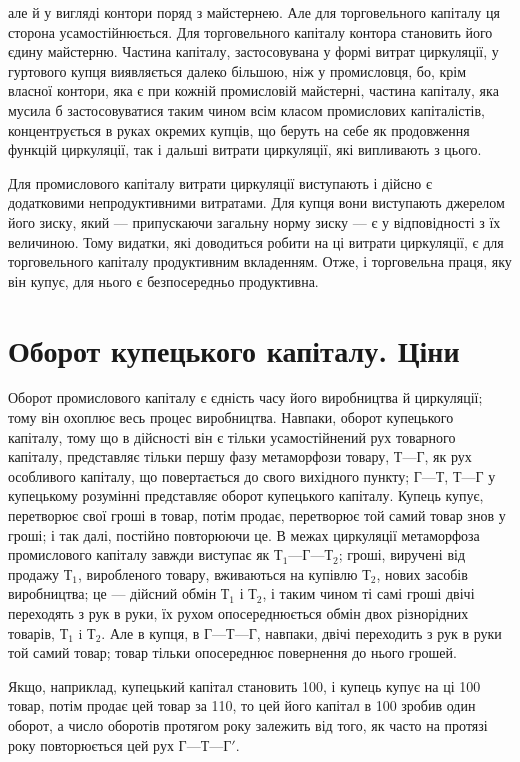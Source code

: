 \parcont{}  %
але й у вигляді контори поряд з майстернею. Але для торговельного
капіталу ця сторона усамостійнюється. Для торговельного
капіталу контора становить його єдину майстерню. Частина
капіталу, застосовувана у формі витрат циркуляції, у гуртового
купця виявляється далеко більшою, ніж у промисловця, бо, крім
власної контори, яка є при кожній промисловій майстерні, частина
капіталу, яка мусила б застосовуватися таким чином всім
класом промислових капіталістів, концентрується в руках окремих
купців, що беруть на себе як продовження функцій циркуляції,
так і дальші витрати циркуляції, які випливають з цього.

Для промислового капіталу витрати циркуляції виступають
і дійсно є додатковими непродуктивними витратами. Для купця
вони виступають джерелом його зиску, який — припускаючи загальну
норму зиску — є у відповідності з їх величиною. Тому
видатки, які доводиться робити на ці витрати циркуляції, є для
торговельного капіталу продуктивним вкладенням. Отже, і торговельна
праця, яку він купує, для нього є безпосередньо
продуктивна.

\section{Оборот купецького капіталу. Ціни}

Оборот промислового капіталу є єдність часу його виробництва
й циркуляції; тому він охоплює весь процес виробництва.
Навпаки, оборот купецького капіталу, тому що в дійсності
він є тільки усамостійнений рух товарного капіталу, представляє
тільки першу фазу метаморфози товару, $Т — Г$, як рух
особливого капіталу, що повертається до свого вихідного пункту;
$Г — Т$, $Т — Г$ у купецькому розумінні представляє оборот купецького
капіталу. Купець купує, перетворює свої гроші в товар, потім
продає, перетворює той самий товар знов у гроші; і так далі,
постійно повторюючи це. В межах циркуляції метаморфоза промислового
капіталу завжди виступає як $Т_1 — Г — Т_2$; гроші, виручені
від продажу $Т_1$, виробленого товару, вживаються на
купівлю $Т_2$, нових засобів виробництва; це — дійсний обмін $Т_1$
і $Т_2$, і таким чином ті самі гроші двічі переходять з рук в руки,
їх рухом опосереднюється обмін двох різнорідних товарів, $Т_1$ i $Т_2$.
Але в купця, в $Г — Т — Г$, навпаки, двічі переходить з рук
в руки той самий товар; товар тільки опосереднює повернення
до нього грошей.

Якщо, наприклад, купецький капітал становить 100, і купець купує на ці 100 товар,
потім продає цей товар за 110, то цей його
капітал в 100 зробив один оборот, а число оборотів протягом
року залежить від того, як часто на протязі року повторюється
цей рух $Г — Т — Г'$.
